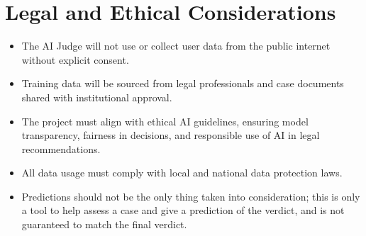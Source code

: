 \documentclass[12pt]{article}
\begin{document}
\section{Legal and Ethical Considerations}

\begin{itemize}
    \item The AI Judge will not use or collect user data from the public internet without explicit consent.
    \item Training data will be sourced from legal professionals and case documents shared with institutional approval.
    \item The project must align with ethical AI guidelines, ensuring model transparency, fairness in decisions, and responsible use of AI in legal recommendations.
    \item All data usage must comply with local and national data protection laws.
    \item Predictions should not be the only thing taken into consideration; this is only a tool to help assess a case and give a prediction of the verdict, and is not guaranteed to match the final verdict.
\end{itemize}
\end{document}
